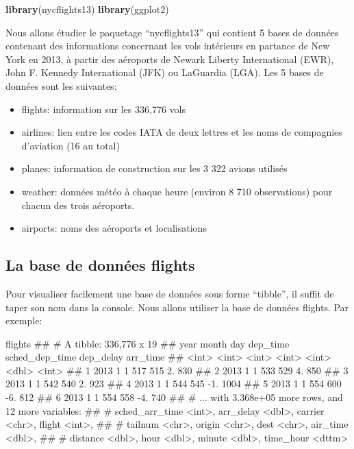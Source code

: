 \documentclass[]{book}
\newenvironment{Shaded}{\begin{snugshade}}{\end{snugshade}}
\newcommand{\KeywordTok}[1]{\textcolor[rgb]{0.13,0.29,0.53}{\textbf{#1}}}
\newcommand{\NormalTok}[1]{#1}
\providecommand{\tightlist}{%
  \setlength{\itemsep}{0pt}\setlength{\parskip}{0pt}}
\theoremstyle{definition}
\theoremstyle{definition}
\theoremstyle{definition}
\theoremstyle{remark}
\begin{document}
\begin{Shaded}
\begin{Highlighting}[]
\KeywordTok{library}\NormalTok{(nycflights13)}
\KeywordTok{library}\NormalTok{(ggplot2)}
\end{Highlighting}
\end{Shaded}

Nous allons étudier le paquetage ``nycflights13'' qui contient 5 bases
de données contenant des informations concernant les vols intérieurs en
partance de New York en 2013, à partir des aéroports de Newark Liberty
International (EWR), John F. Kennedy International (JFK) ou LaGuardia
(LGA). Les 5 bases de données sont les suivantes:

\begin{itemize}
\tightlist
\item
  flights: information sur les 336,776 vols
\item
  airlines: lien entre les codes IATA de deux lettres et les noms de
  compagnies d'aviation (16 au total)
\item
  planes: information de construction sur les 3 322 avions utilisés
\item
  weather: données météo à chaque heure (environ 8 710 observations)
  pour chacun des trois aéroports.
\item
  airports: noms des aéroports et localisations
\end{itemize}

\hypertarget{la-base-de-donnees-flights}{%
\subsection{La base de données
flights}\label{la-base-de-donnees-flights}}

Pour visualiser facilement une base de données sous forme ``tibble'', il
suffit de taper son nom dans la console. Nous allons utiliser la base de
données flights. Par exemple:

\begin{Shaded}
\begin{Highlighting}[]
\NormalTok{flights}
\NormalTok{## # A tibble: 336,776 x 19}
\NormalTok{##    year month   day dep_time sched_dep_time dep_delay arr_time}
\NormalTok{##   <int> <int> <int>    <int>          <int>     <dbl>    <int>}
\NormalTok{## 1  2013     1     1      517            515        2.      830}
\NormalTok{## 2  2013     1     1      533            529        4.      850}
\NormalTok{## 3  2013     1     1      542            540        2.      923}
\NormalTok{## 4  2013     1     1      544            545       -1.     1004}
\NormalTok{## 5  2013     1     1      554            600       -6.      812}
\NormalTok{## 6  2013     1     1      554            558       -4.      740}
\NormalTok{## # ... with 3.368e+05 more rows, and 12 more variables:}
\NormalTok{## #   sched_arr_time <int>, arr_delay <dbl>, carrier <chr>, flight <int>,}
\NormalTok{## #   tailnum <chr>, origin <chr>, dest <chr>, air_time <dbl>,}
\NormalTok{## #   distance <dbl>, hour <dbl>, minute <dbl>, time_hour <dttm>}
\end{Highlighting}
\end{Shaded}
\end{document}

